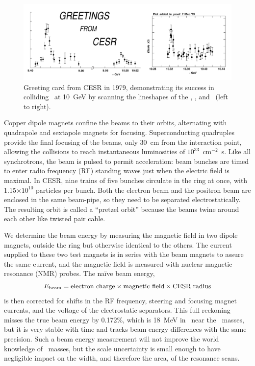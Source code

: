 \documentclass{cornell}
\begin{document}
\begin{figure}[p]
  \begin{center}
    \includegraphics[width=\linewidth]{plots/greetingsfromcesr}
  \end{center}
  \caption[First scan of \ups\ resonances by CESR in
  1979]{\label{greetingsfromcesr} Greeting card from CESR in 1979,
  demonstrating its success in colliding \ee\ at 10~GeV by scanning
  the lineshapes of the \us, \uss, and \usss\ (left to right).}
\end{figure}

Copper dipole magnets confine the beams to their orbits, alternating
with quadrapole and sextapole magnets for focusing.  Superconducting
quadruples provide the final focusing of the beams, only 30~cm from
the interaction point, allowing the collisions to reach instantaneous
luminosities of $10^{33}$~cm$^{-2}$~s\inv.  Like all synchrotrons, the
beam is pulsed to permit acceleration: beam bunches are timed to enter
radio frequency (RF) standing waves just when the electric field is
maximal.  In CESR, nine trains of five bunches circulate in the ring
at once, with 1.15$\times 10^{10}$ particles per bunch.  Both the
electron beam and the positron beam are enclosed in the same
beam-pipe, so they need to be separated electrostatically.  The
resulting orbit is called a ``pretzel orbit'' because the beams twine
around each other like twisted pair cable.

We determine the beam energy by measuring the magnetic field in two
dipole magnets, outside the ring but otherwise identical to the
others.  The current supplied to these two test magnets is in series
with the beam magnets to assure the same current, and the magnetic
field is measured with nuclear magnetic resonance (NMR) probes.  The
na\"ive beam energy,
\begin{equation}
  E_{\mbox{\scriptsize beam}} = \mbox{electron charge} \times \mbox{magnetic field}
  \times \mbox{CESR radius}
\end{equation}
is then corrected for shifts in the RF frequency, steering and
focusing magnet currents, and the voltage of the electrostatic
separators.  This full reckoning misses the true beam energy by
0.172\%, which is 18~MeV in \ecm\ near the \ups\ masses, but it is
very stable with time and tracks beam energy differences with the same
precision.  Such a beam energy measurement will not improve the world
knowledge of \ups\ masses, but the scale uncertainty is small enough
to have negligible impact on the width, and therefore the area, of the
resonance scans.
\end{document}
